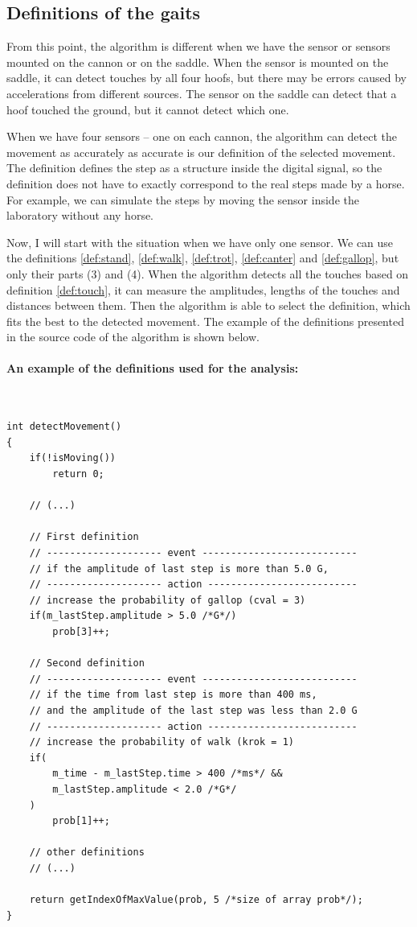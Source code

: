 \subsection{Definitions of the gaits}
From this point, the algorithm is different when we have the sensor or sensors mounted on the cannon or on the saddle. When the sensor is mounted on the saddle, it can detect touches by all four hoofs, but there may be errors caused by accelerations from different sources. The sensor on the saddle can detect that a hoof touched the ground, but it cannot detect which one.

When we have four sensors -- one on each cannon, the algorithm can detect the movement as accurately as accurate is our definition of the selected movement. The definition defines the step as a structure inside the digital signal, so the definition does not have to exactly correspond to the real steps made by a horse. For example, we can simulate the steps by moving the sensor inside the laboratory without any horse.

Now, I will start with the situation when we have only one sensor. We can use the definitions \ref{def:stand}, \ref{def:walk}, \ref{def:trot}, \ref{def:canter} and \ref{def:gallop}, but only their parts (3) and (4). When the algorithm detects all the touches based on definition \ref{def:touch}, it can measure the amplitudes, lengths of the touches and distances between them. Then the algorithm is able to select the definition, which fits the best to the detected movement. The example of the definitions presented in the source code of the algorithm is shown below.

\paragraph{An example of the definitions used for the analysis:} \quad\\
\Cpp
\begin{lstlisting}
int detectMovement()
{
	if(!isMoving())
		return 0;
	
	// (...)
	
	// First definition
	// -------------------- event ---------------------------
	// if the amplitude of last step is more than 5.0 G,
	// -------------------- action --------------------------
	// increase the probability of gallop (cval = 3)
	if(m_lastStep.amplitude > 5.0 /*G*/)
		prob[3]++;
	
	// Second definition
	// -------------------- event ---------------------------
	// if the time from last step is more than 400 ms,
	// and the amplitude of the last step was less than 2.0 G
	// -------------------- action --------------------------
	// increase the probability of walk (krok = 1)
	if(
		m_time - m_lastStep.time > 400 /*ms*/ &&
		m_lastStep.amplitude < 2.0 /*G*/
	)
		prob[1]++;
	
	// other definitions
	// (...)
	
	return getIndexOfMaxValue(prob, 5 /*size of array prob*/);
}
\end{lstlisting}

